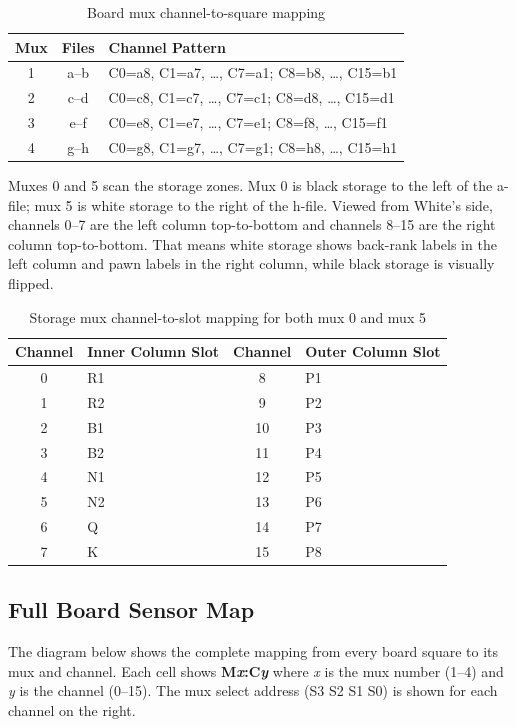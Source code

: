 \documentclass[11pt,a4paper]{report}
\begin{document}
\begin{table}[H]
\centering
\begin{tabular}{ccl}
\toprule
\textbf{Mux} & \textbf{Files} & \textbf{Channel Pattern} \\
\midrule
1 & a--b & C0=a8, C1=a7, \ldots, C7=a1; C8=b8, \ldots, C15=b1 \\
2 & c--d & C0=c8, C1=c7, \ldots, C7=c1; C8=d8, \ldots, C15=d1 \\
3 & e--f & C0=e8, C1=e7, \ldots, C7=e1; C8=f8, \ldots, C15=f1 \\
4 & g--h & C0=g8, C1=g7, \ldots, C7=g1; C8=h8, \ldots, C15=h1 \\
\bottomrule
\end{tabular}
\caption{Board mux channel-to-square mapping}
\end{table}

Muxes 0 and 5 scan the storage zones. Mux 0 is black storage to the left of the a-file; mux 5 is white storage to the right of the h-file. Viewed from White's side, channels 0--7 are the left column top-to-bottom and channels 8--15 are the right column top-to-bottom. That means white storage shows back-rank labels in the left column and pawn labels in the right column, while black storage is visually flipped.

\begin{table}[H]
\centering
\begin{tabular}{cl|cl}
\toprule
\textbf{Channel} & \textbf{Inner Column Slot} & \textbf{Channel} & \textbf{Outer Column Slot} \\
\midrule
0 & R1 & 8 & P1 \\
1 & R2 & 9 & P2 \\
2 & B1 & 10 & P3 \\
3 & B2 & 11 & P4 \\
4 & N1 & 12 & P5 \\
5 & N2 & 13 & P6 \\
6 & Q & 14 & P7 \\
7 & K & 15 & P8 \\
\bottomrule
\end{tabular}
\caption{Storage mux channel-to-slot mapping for both mux 0 and mux 5}
\end{table}

\subsection{Full Board Sensor Map}

The diagram below shows the complete mapping from every board square to its mux and channel. Each cell shows \textbf{M\textit{x}:C\textit{y}} where \textit{x} is the mux number (1--4) and \textit{y} is the channel (0--15). The mux select address (S3 S2 S1 S0) is shown for each channel on the right.
\end{document}
